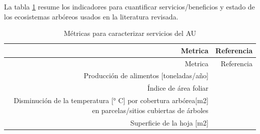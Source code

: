\documentclass[12pt,]{book}
\begin{document}
La tabla \ref{tab:ind-AU} resume los indicadores para cuantificar
servicios/beneficios y estado de los ecosistemas arbóreos usados en la
literatura revisada.

\begin{longtable}[]{@{}rr@{}}
\caption{\label{tab:ind-AU} Métricas para caracterizar servicios del
AU}\tabularnewline
\toprule
\begin{minipage}[b]{0.57\columnwidth}\raggedleft\strut
Metrica\strut
\end{minipage} & \begin{minipage}[b]{0.31\columnwidth}\raggedleft\strut
Referencia\strut
\end{minipage}\tabularnewline
\midrule
\endfirsthead
\toprule
\begin{minipage}[b]{0.57\columnwidth}\raggedleft\strut
Metrica\strut
\end{minipage} & \begin{minipage}[b]{0.31\columnwidth}\raggedleft\strut
Referencia\strut
\end{minipage}\tabularnewline
\midrule
\endhead
\begin{minipage}[t]{0.57\columnwidth}\raggedleft\strut
Producción de alimentos {[}toneladas/año{]}\strut
\end{minipage} & \begin{minipage}[t]{0.31\columnwidth}\raggedleft\strut
\citep{gomez-baggethun_classifying_2013}\strut
\end{minipage}\tabularnewline
\begin{minipage}[t]{0.57\columnwidth}\raggedleft\strut
Índice de área foliar\strut
\end{minipage} & \begin{minipage}[t]{0.31\columnwidth}\raggedleft\strut
\citep{gomez-baggethun_classifying_2013}\strut
\end{minipage}\tabularnewline
\begin{minipage}[t]{0.57\columnwidth}\raggedleft\strut
Disminución de la temperatura {[}° C{]} por cobertura arbórea{[}m2{]} en
parcelas/sitios cubiertas de árboles\strut
\end{minipage} & \begin{minipage}[t]{0.31\columnwidth}\raggedleft\strut
\citep{gomez-baggethun_classifying_2013}\strut
\end{minipage}\tabularnewline
\begin{minipage}[t]{0.57\columnwidth}\raggedleft\strut
Superficie de la hoja {[}m2{]}\strut
\end{minipage} & \begin{minipage}[t]{0.31\columnwidth}\raggedleft\strut

\end{minipage}
\end{longtable}
\end{document}
